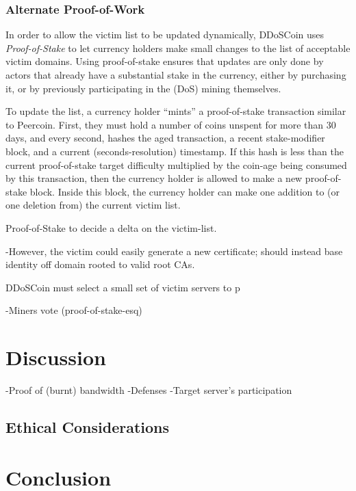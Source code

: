 \subsubsection{Alternate Proof-of-Work}

In order to allow the victim list to be updated dynamically, DDoSCoin uses
\emph{Proof-of-Stake} to let currency holders make small changes to the list of
acceptable victim domains. Using proof-of-stake ensures that updates are only
done by actors that already have a substantial stake in the currency, either by
purchasing it, or by previously participating in the (DoS) mining themselves.

To update the list, a currency holder ``mints'' a proof-of-stake transaction
similar to Peercoin. First, they must hold a number of coins unspent for more
than 30 days, and every second, hashes the aged transaction, a recent
stake-modifier block, and a current (seconds-resolution) timestamp. If this hash
is less than the current proof-of-stake target difficulty multiplied by the
coin-age being consumed by this transaction, then the currency holder is allowed
to make a new proof-of-stake block. Inside this block, the currency holder can
make one addition to (or one deletion from) the current victim list.



Proof-of-Stake to decide a delta on the victim-list.

-However, the victim could easily generate a new certificate; should instead
base identity off domain rooted to valid root CAs.


DDoSCoin must select a small set of victim servers to p


-Miners vote (proof-of-stake-esq)




\section{Discussion}

-Proof of (burnt) bandwidth
-Defenses
-Target server's participation

\subsection{Ethical Considerations}
\shrug


\section{Conclusion}



{\footnotesize\balance

}


